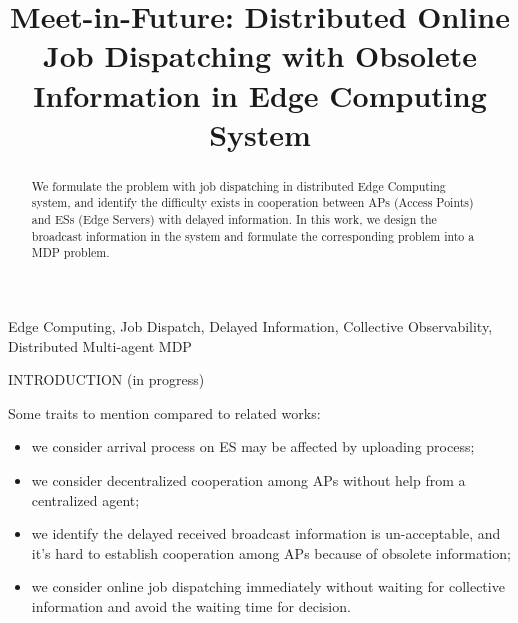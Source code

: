 \documentclass[10pt, conference, letterpaper]{IEEEtran}
\begin{document}
    \title{
        Meet-in-Future: Distributed Online Job Dispatching with Obsolete Information in Edge Computing System
    }
    \author{
    }
    \maketitle

    \begin{abstract}
        \label{sec:abstract}
        We formulate the problem with job dispatching in distributed Edge Computing system, and identify the difficulty exists in cooperation between APs (Access Points) and ESs (Edge Servers) with delayed information. In this work, we design the broadcast information in the system and formulate the corresponding problem into a MDP problem.
    \end{abstract}

    \begin{IEEEkeywords}
        Edge Computing, Job Dispatch, Delayed Information, Collective Observability, Distributed Multi-agent MDP
    \end{IEEEkeywords}

    \begin{section}{INTRODUCTION}
        \label{sec:introduction}
        (in progress)

        Some traits to mention compared to related works:
        \begin{itemize}
            \item we consider arrival process on ES may be affected by uploading process;
            \item we consider decentralized cooperation among APs without help from a centralized agent;
            \item we identify the delayed received broadcast information is un-acceptable, and it's hard to establish cooperation among APs because of obsolete information;
            \item we consider online job dispatching immediately without waiting for collective information and avoid the waiting time for decision.
        \end{itemize}
    \end{section}
\end{document}
